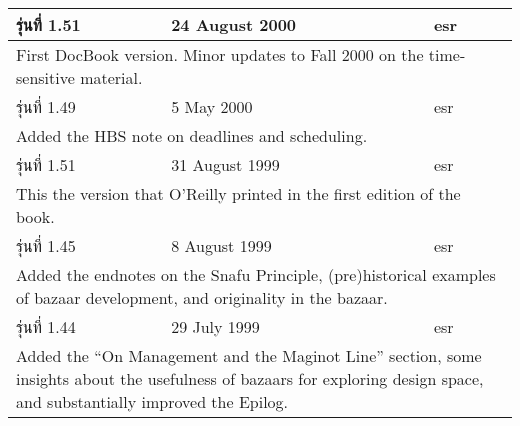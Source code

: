 {\begin{tabular*}{\textwidth}{|l|l|l|}
    รุ่นที่ 1.51 & 24 August 2000    & esr                                                                                                                                                                           \\  \hline
    \multicolumn{3}{|p{.963\textwidth}|}{First DocBook version. Minor updates to Fall 2000 on the time-sensitive material.}                                                                                          \\  \hline
    รุ่นที่ 1.49 & 5 May 2000        & esr                                                                                                                                                                           \\  \hline
    \multicolumn{3}{|p{.963\textwidth}|}{Added the HBS note on deadlines and scheduling.}                                                                                                                            \\ \hline
    รุ่นที่ 1.51 & 31 August 1999    & esr                                                                                                                                                                           \\  \hline
    \multicolumn{3}{|p{.963\textwidth}|}{This the version that O'Reilly printed in the first edition of the book.}                                                                                                   \\ \hline
    รุ่นที่ 1.45 & 8 August 1999     & esr                                                                                                                                                                           \\  \hline
    \multicolumn{3}{|p{.963\textwidth}|}{Added the endnotes on the Snafu Principle, (pre)historical examples of bazaar development, and originality in the bazaar.}                                                  \\ \hline
    รุ่นที่ 1.44 & 29 July 1999      & esr                                                                                                                                                                           \\  \hline
    \multicolumn{3}{|p{.963\textwidth}|}{Added the ``On Management and the Maginot Line'' section, some insights about the usefulness of bazaars for exploring design space, and substantially improved the Epilog.} \\ \hline

\end{tabular*}}
